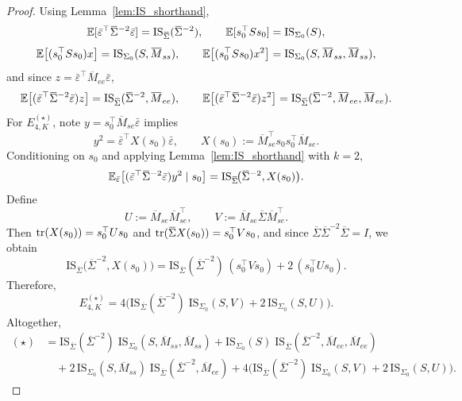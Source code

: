 \begin{proof}
Using Lemma~\ref{lem:IS_shorthand},
\[
\E[\bar\varepsilon^\top  \overline\Sigma^{-2}\bar\varepsilon]=\mathrm{IS}_{\overline\Sigma}( \overline\Sigma^{-2}),
\qquad
\E[s_0^\top S s_0]=\mathrm{IS}_{\Sigma_0}(S),
\]
\[
\E\!\left[(s_0^\top S s_0)x\right]=\mathrm{IS}_{\Sigma_0}(S,\overline M_{ss}),
\qquad
\E\!\left[(s_0^\top S s_0)x^2\right]=\mathrm{IS}_{\Sigma_0}(S,\overline M_{ss},\overline M_{ss}),
\]
and since $z=\bar\varepsilon^\top \overline M_{ee}\bar\varepsilon$,
\[
\E\!\left[(\bar\varepsilon^\top  \overline\Sigma^{-2}\bar\varepsilon)z\right]
=\mathrm{IS}_{\overline\Sigma}( \overline\Sigma^{-2},\overline M_{ee}),
\qquad
\E\!\left[(\bar\varepsilon^\top  \overline\Sigma^{-2}\bar\varepsilon)z^2\right]
=\mathrm{IS}_{\overline\Sigma}( \overline\Sigma^{-2},\overline M_{ee},\overline M_{ee}).
\]
For $E^{(\star)}_{4,K}$, note $y=s_0^\top \overline M_{se}\bar\varepsilon$ implies
\[
y^2=\bar\varepsilon^\top X(s_0)\bar\varepsilon,
\qquad
X(s_0):=\overline M_{se}^\top s_0 s_0^\top \overline M_{se}.
\]
Conditioning on $s_0$ and applying Lemma~\ref{lem:IS_shorthand} with $k=2$,
\[
\E_{\bar\varepsilon}\!\left[(\bar\varepsilon^\top  \overline\Sigma^{-2}\bar\varepsilon)y^2\mid s_0\right]
=\mathrm{IS}_{\overline\Sigma}\!\big( \overline\Sigma^{-2},X(s_0)\big).
\]
Define
\[
U:=\overline M_{se}\overline M_{se}^\top,
\qquad
V:=\overline M_{se}\overline\Sigma \overline M_{se}^\top.
\]
Then $\operatorname{tr}(X(s_0))=s_0^\top U s_0$ and $\tr(\overline\Sigma X(s_0))=s_0^\top V s_0$, and since
$\overline\Sigma  \overline\Sigma^{-2}\overline\Sigma=I$, we obtain
\[
\mathrm{IS}_{\overline\Sigma}\!\big( \overline\Sigma^{-2},X(s_0)\big)
=
\mathrm{IS}_{\overline\Sigma}( \overline\Sigma^{-2})\,(s_0^\top V s_0)+2\,(s_0^\top U s_0).
\]
Therefore,
\[
E^{(\star)}_{4,K}
=
4\Big(
\mathrm{IS}_{\overline\Sigma}( \overline\Sigma^{-2})\;\mathrm{IS}_{\Sigma_0}(S,V)
+
2\,\mathrm{IS}_{\Sigma_0}(S,U)
\Big).
\]
Altogether,
\begin{equation}\label{eq:star-final}
\begin{aligned}
(\star)
&=
\mathrm{IS}_{\overline\Sigma}( \overline\Sigma^{-2})\;\mathrm{IS}_{\Sigma_0}(S,\overline M_{ss},\overline M_{ss})
+\mathrm{IS}_{\Sigma_0}(S)\;\mathrm{IS}_{\overline\Sigma}( \overline\Sigma^{-2},\overline M_{ee},\overline M_{ee})\\
&\quad
+2\,\mathrm{IS}_{\Sigma_0}(S,\overline M_{ss})\;\mathrm{IS}_{\overline\Sigma}( \overline\Sigma^{-2},\overline M_{ee})
+4\Big(
\mathrm{IS}_{\overline\Sigma}( \overline\Sigma^{-2})\;\mathrm{IS}_{\Sigma_0}(S,V)
+2\,\mathrm{IS}_{\Sigma_0}(S,U)
\Big).
\end{aligned}
\end{equation}


\end{proof}
